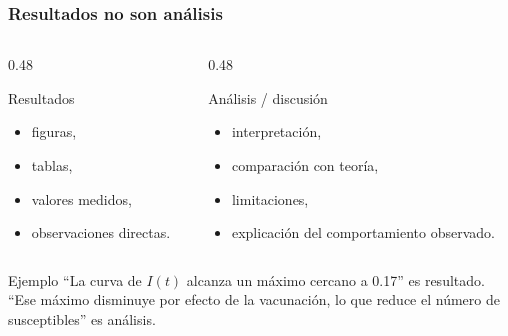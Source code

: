 \begin{frame}
\frametitle{Resultados \textbf{no} son an\'alisis}
\begin{columns}[T]
\begin{column}{0.48\textwidth}
\begin{block}{Resultados}
\begin{itemize}
    \item figuras,
    \item tablas,
    \item valores medidos,
    \item observaciones directas.
\end{itemize}
\end{block}
\end{column}
\begin{column}{0.48\textwidth}
\begin{block}{An\'alisis / discusi\'on}
\begin{itemize}
    \item interpretaci\'on,
    \item comparaci\'on con teor\'ia,
    \item limitaciones,
    \item explicaci\'on del comportamiento observado.
\end{itemize}
\end{block}
\end{column}
\end{columns}

\vspace{0.2cm}
\begin{alertblock}{Ejemplo}
``La curva de $I(t)$ alcanza un m\'aximo cercano a 0.17'' es resultado.\newline
``Ese m\'aximo disminuye por efecto de la vacunaci\'on, lo que reduce el n\'umero de susceptibles'' es an\'alisis.
\end{alertblock}
\end{frame}

